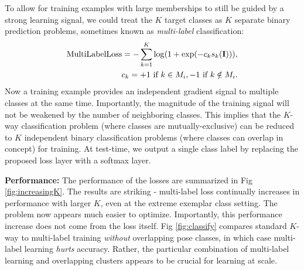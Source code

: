 \documentclass[letterpaper]{article} %
\begin{document}
To allow for training examples with large memberships to still be guided by a strong learning signal, we could treat the $K$ target classes as $K$ separate binary prediction problems, sometimes known as {\em multi-label} classification:
\begin{align}
\label{eq:multilabel}
    \text{MultiLabelLoss} = -\sum_{k = 1}^{K}\log(1 + \exp(-c_k s_k({\bf I}))), \\
    c_k = +1 \text{ if } k \in M_i, -1 \text{ if } k \notin M_i.
\end{align}
Now a training example provides an independent gradient signal to multiple classes at the same time. Importantly, the magnitude of the training signal will not be weakened by the number of neighboring classes. This implies that the $K$-way classification problem (where classes are mutually-exclusive) can be reduced to $K$ independent binary classification problems (where classes can overlap in concept) for training. At test-time, we output a single class label by replacing the proposed loss layer with a softmax layer. 

{\bf Performance:} The performance of the losses are summarized in Fig \ref{fig:increasingK}. The results are striking - multi-label loss continually increases in performance with larger $K$, even at the extreme exemplar class setting. The problem now appears much easier to optimize. Importantly, this performance increase does not come from the loss itself. Fig \ref{fig:classify} compares standard $K$-way to multi-label training {\em without} overlapping pose classes, in which case multi-label learning {\em hurts} accuracy. %
Rather, the particular combination of multi-label learning and overlapping clusters appears to be crucial for learning at scale.
\end{document}
